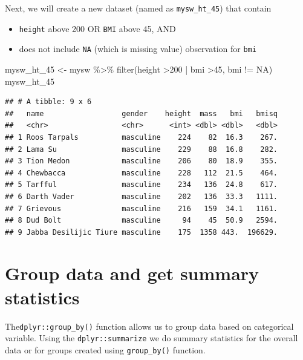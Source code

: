 \documentclass[
]{book}
\makeatletter
\newenvironment{Shaded}{\begin{snugshade}}{\end{snugshade}}
\newcommand{\DecValTok}[1]{\textcolor[rgb]{0.06,0.06,0.06}{#1}}
\newcommand{\FunctionTok}[1]{\textcolor[rgb]{0,0,0}{#1}}
\newcommand{\NormalTok}[1]{#1}
\newcommand{\OtherTok}[1]{\textcolor[rgb]{0.37,0.37,0.37}{#1}}
\newcommand{\SpecialCharTok}[1]{\textcolor[rgb]{0,0,0}{#1}}
\newcommand{\StringTok}[1]{\textcolor[rgb]{0.5,0.5,0.5}{#1}}
\providecommand{\tightlist}{%
  \setlength{\itemsep}{0pt}\setlength{\parskip}{0pt}}
\newenvironment{kframe}{%
\medskip{}
\setlength{\fboxsep}{.8em}
 \def\at@end@of@kframe{}%
 \ifinner\ifhmode%
  \def\at@end@of@kframe{\end{minipage}}%
  \begin{minipage}{\columnwidth}%
 \fi\fi%
 \def\FrameCommand##1{\hskip\@totalleftmargin \hskip-\fboxsep
 \colorbox{shadecolor}{##1}\hskip-\fboxsep
     \hskip-\linewidth \hskip-\@totalleftmargin \hskip\columnwidth}%
 \MakeFramed {\advance\hsize-\width
   \@totalleftmargin\z@ \linewidth\hsize
   \@setminipage}}%
 {\par\unskip\endMakeFramed%
 \at@end@of@kframe}
\renewenvironment{Shaded}{\begin{kframe}}{\end{kframe}}
\makeatother
\begin{document}
Next, we will create a new dataset (named as \texttt{mysw\_ht\_45}) that contain

\begin{itemize}
\tightlist
\item
  \texttt{height} above 200 OR \texttt{BMI} above 45, AND
\item
  does not include \texttt{NA} (which is missing value) observation for \texttt{bmi}
\end{itemize}

\begin{Shaded}
\begin{Highlighting}[]
\NormalTok{mysw\_ht\_45 }\OtherTok{\textless{}{-}}\NormalTok{ mysw }\SpecialCharTok{\%\textgreater{}\%} \FunctionTok{filter}\NormalTok{(height }\SpecialCharTok{\textgreater{}}\DecValTok{200} \SpecialCharTok{|}\NormalTok{ bmi }\SpecialCharTok{\textgreater{}}\DecValTok{45}\NormalTok{, bmi }\SpecialCharTok{!=} \StringTok{\textquotesingle{}NA\textquotesingle{}}\NormalTok{)}
\NormalTok{mysw\_ht\_45}
\end{Highlighting}
\end{Shaded}

\begin{verbatim}
## # A tibble: 9 x 6
##   name                  gender    height  mass   bmi   bmisq
##   <chr>                 <chr>      <int> <dbl> <dbl>   <dbl>
## 1 Roos Tarpals          masculine    224    82  16.3    267.
## 2 Lama Su               masculine    229    88  16.8    282.
## 3 Tion Medon            masculine    206    80  18.9    355.
## 4 Chewbacca             masculine    228   112  21.5    464.
## 5 Tarfful               masculine    234   136  24.8    617.
## 6 Darth Vader           masculine    202   136  33.3   1111.
## 7 Grievous              masculine    216   159  34.1   1161.
## 8 Dud Bolt              masculine     94    45  50.9   2594.
## 9 Jabba Desilijic Tiure masculine    175  1358 443.  196629.
\end{verbatim}

\hypertarget{group-data-and-get-summary-statistics}{%
\section{Group data and get summary statistics}\label{group-data-and-get-summary-statistics}}

The\texttt{dplyr::group\_by()} function allows us to group data based on categorical variable. Using the \texttt{dplyr::summarize} we do summary statistics for the overall data or for groups created using \texttt{group\_by()} function.
\end{document}
